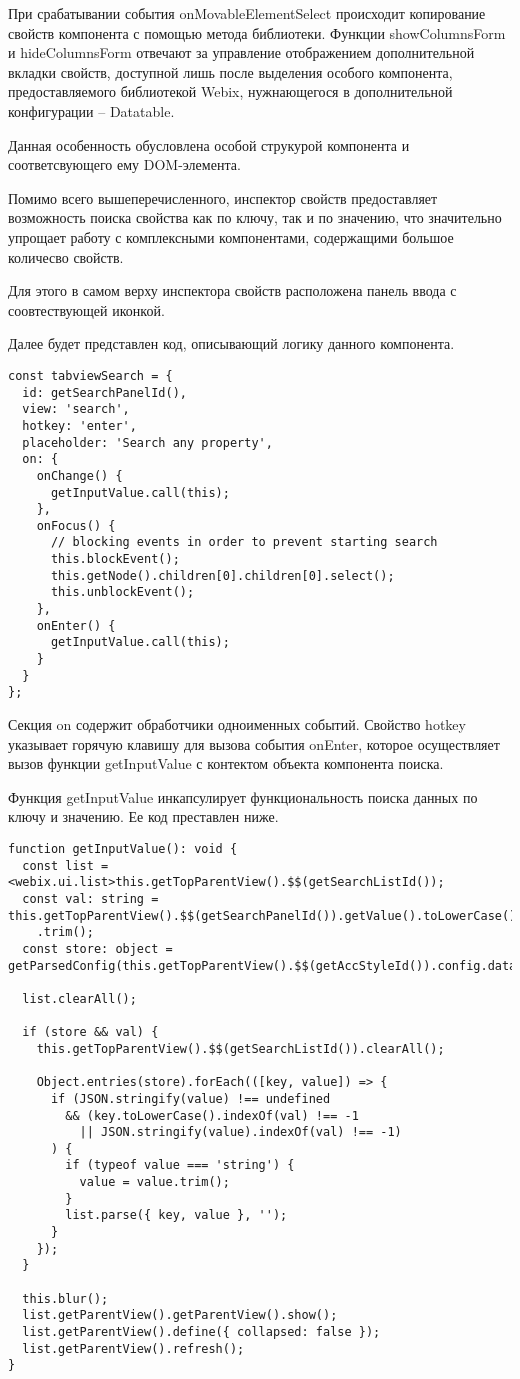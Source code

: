 При срабатывании события onMovableElementSelect происходит копирование свойств компонента с помощью метода библиотеки. Функции showColumnsForm и hideColumnsForm отвечают за управление отображением дополнительной вкладки свойств, доступной лишь после выделения особого компонента, предоставляемого библиотекой Webix, нужнающегося в дополнительной конфигурации -- Datatable.

Данная особенность обусловлена особой струкурой компонента и соответсвующего ему DOM-элемента.

Помимо всего вышеперечисленного, инспектор свойств предоставляет возможность поиска свойства как по ключу, так и по значению, что значительно упрощает работу с комплексными компонентами, содержащими большое количесво свойств.

Для этого в самом верху инспектора свойств расположена панель ввода с соовтествующей иконкой.

Далее будет представлен код, описывающий логику данного компонента.

\begin{lstlisting}
const tabviewSearch = {
  id: getSearchPanelId(),
  view: 'search',
  hotkey: 'enter',
  placeholder: 'Search any property',
  on: {
    onChange() {
      getInputValue.call(this);
    },
    onFocus() {
      // blocking events in order to prevent starting search
      this.blockEvent();
      this.getNode().children[0].children[0].select();
      this.unblockEvent();
    },
    onEnter() {
      getInputValue.call(this);
    }
  }
};
\end{lstlisting}

Секция on содержит обработчики одноименных событий. Свойство hotkey указывает горячую клавишу для вызова события onEnter, которое осуществляет вызов функции getInputValue с контектом объекта компонента поиска.

Функция getInputValue инкапсулирует функциональность поиска данных по ключу и значению. Ее код преставлен ниже.

\begin{lstlisting}
function getInputValue(): void {
  const list = <webix.ui.list>this.getTopParentView().$$(getSearchListId());
  const val: string = this.getTopParentView().$$(getSearchPanelId()).getValue().toLowerCase()
    .trim();
  const store: object = getParsedConfig(this.getTopParentView().$$(getAccStyleId()).config.data);

  list.clearAll();

  if (store && val) {
    this.getTopParentView().$$(getSearchListId()).clearAll();

    Object.entries(store).forEach(([key, value]) => {
      if (JSON.stringify(value) !== undefined
        && (key.toLowerCase().indexOf(val) !== -1
          || JSON.stringify(value).indexOf(val) !== -1)
      ) {
        if (typeof value === 'string') {
          value = value.trim();
        }
        list.parse({ key, value }, '');
      }
    });
  }

  this.blur();
  list.getParentView().getParentView().show();
  list.getParentView().define({ collapsed: false });
  list.getParentView().refresh();
}
\end{lstlisting}

